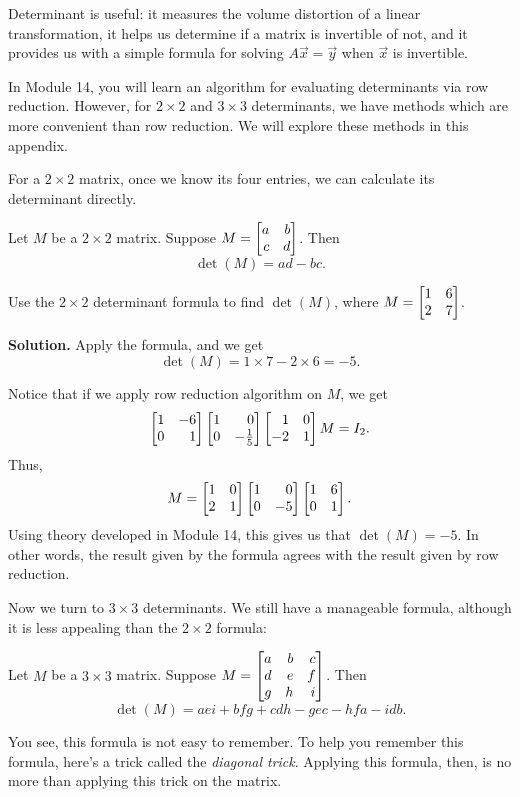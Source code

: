 

Determinant is useful: it measures the volume distortion of a linear transformation, it helps us determine if a matrix is invertible of not, and it provides us with a simple formula for solving \(A\vec x=\vec y\) when \(\vec x\) is invertible.

In Module 14, you will learn an algorithm for evaluating determinants via row reduction. However, for \(2\times 2\) and \(3\times 3\) determinants, we have methods which are more convenient than row reduction. We will explore these methods in this appendix.

For a \(2\times 2\) matrix, once we know its four entries, we can calculate its determinant directly.
\begin{theorem}
  Let \(M\) be a \(2\times 2\) matrix. Suppose \(M=\mat{a & b \\ c & d}\). Then \[\det(M)=ad-bc.\]
\end{theorem}
\begin{example}
Use the \(2\times 2\) determinant formula to find \(\det(M)\), where \(M=\mat{1 & 6 \\ 2  & 7}\).
\end{example}
\textbf{Solution. }Apply the formula, and we get \[\det(M)=1\times 7-2\times 6=-5.\]

Notice that if we apply row reduction algorithm on \(M\), we get \[\mat{1 & -6 \\ 0 & 1}\mat{1 & 0 \\ 0 & -\frac{1}{5}}\mat{1 & 0 \\ -2 & 1}M=I_{2}.\]
Thus, \[M=\mat{1 & 0 \\ 2 & 1}\mat{1 & 0 \\ 0 & -5}\mat{1 & 6 \\ 0 & 1}.\]
Using theory developed in Module 14, this gives us that \(\det(M)=-5\). In other words, the result given by the formula agrees with the result given by row reduction.

Now we turn to \(3\times 3\) determinants. We still have a manageable formula, although it is less appealing than the \(2\times 2\) formula:
\begin{theorem}
  Let \(M\) be a \(3\times 3\) matrix. Suppose \(M=\mat{a & b & c \\ d & e & f \\ g & h & i}\). Then \[\det(M)=aei+bfg+cdh-gec-hfa-idb.\]
\end{theorem}
You see, this formula is not easy to remember. To help you remember this formula, here's a trick called the \textit{diagonal trick}. Applying this formula, then, is no more than applying this trick on the matrix.

